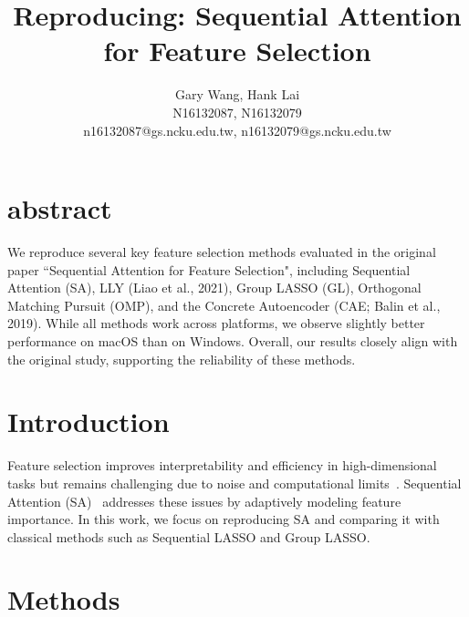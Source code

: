 \documentclass[a4paper,twocolumn]{article} %
\begin{document}

\title{Reproducing: Sequential Attention for Feature Selection}
\author{Gary Wang, Hank Lai \\ N16132087, N16132079 \\ n16132087@gs.ncku.edu.tw, n16132079@gs.ncku.edu.tw} 


\maketitle                     %

\section{abstract}
We reproduce several key feature selection methods evaluated in the original paper ``Sequential Attention for Feature Selection", including Sequential Attention (SA), LLY (Liao et al., 2021), Group LASSO (GL), Orthogonal Matching Pursuit (OMP), and the Concrete Autoencoder (CAE; Balin et al., 2019). While all methods work across platforms, we observe slightly better performance on macOS than on Windows. Overall, our results closely align with the original study, supporting the reliability of these methods.


\section{Introduction}

Feature selection improves interpretability and efficiency in high-dimensional tasks but remains challenging due to noise and computational limits~\cite{nordling2013}. Sequential Attention (SA)~\cite{yasuda2023} addresses these issues by adaptively modeling feature importance. In this work, we focus on reproducing SA and comparing it with classical methods such as Sequential LASSO and Group LASSO.
\section{Methods}
\end{document}
